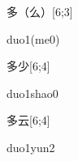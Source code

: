 \begin{verbete}[duo1(me0)]{多（么）}[6;3]
\begin{pronuncia}{duo1(me0)}
\end{pronuncia}
\end{verbete}

\begin{verbete}{多少}[6;4]
\begin{pronuncia}{duo1shao0}
\end{pronuncia}
\end{verbete}

\begin{verbete}{多云}[6;4]
\begin{pronuncia}{duo1yun2}
\end{pronuncia}
\end{verbete}

